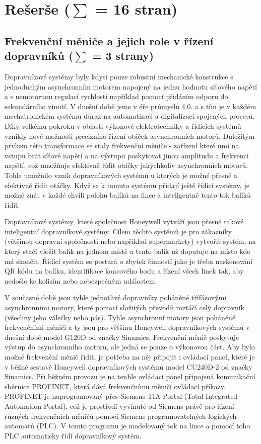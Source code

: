 \chapter{Rešerše ($\sum$ = 16 stran)} \label{chap:Rešerše}
\section{Frekvenční měniče a jejich role v řízení dopravníků ($\sum$ = 3 strany)}\label{sec:FrekvencniMeniceAJejichRole}

Dopravníkové systémy byly kdysi pouze robustní mechanické konstrukce s jednoduchým asynchronním motorem napojený na jednu hodnotu síťového napětí a s nemotornou regulací rychlosti například pomocí přidáním odporu do sekundárního vinutí. V dnešní době jsme v éře průmyslu 4.0. a s tím je v každém mechatronickém systému důraz na automatizaci a digitalizaci spojených procesů. Díky velkému pokroku v oblasti výkonové elektrotechniky a řídících systémů vznikly nové možnosti precizního řízení otáček asynchronních motorů. Důležitým prvkem této transformace se staly frekvenční měniče - zařízení které umí na vstupu brát síťové napětí a na výstupu poskytovat jinou amplitudu a frekvenci napětí, což umožňuje efektivně řídit otáčky jakýchkoliv asynchronních motorů. Tohle umožnilo vznik dopravníkových systémů u kterých je možné přesně a efektivně řídit otáčky. Když se k tomuto systému přidají ještě řídící systémy, je možné znát v každé chvíli polohu balíků na lince a inteligentně tento tok balíků řídit.

Dopravníkové systémy, které společnost Honeywell vytváří jsou přesně takové inteligentní dopravníkové systémy. Cílem těchto systémů je pro zákazníky (většinou dopravní společnosti nebo například supermarkety) vytvořit systém, na který stačí vložit balík na jednom místě a tento balík už doputuje na místo kde má skončit. Řídící systém se postará o zbytek činností jako je třeba naskenování QR kódu na balíku, identifikace koncového bodu a řízení všech linek tak, aby nedošlo ke kolizím nebo nebezpečným událostem.

V současné době jsou tyhle jednotlivé dopravníky poháněné třífázovými asynchronními motory, které pomocí složitých převodů roztáčí celý dopravník (všechny jeho válečky nebo pás). Tyhle asynchronní motory jsou poháněné frekvenčními měniči a ty jsou pro většinu Honeywell dopravníkových systémů v dnešní době model G120D od značky Sinamics. Frekvenční měnič poskytuje výstup do asynchronního motoru, ale jedná se pouze o výkonovou část. Aby bylo možné frekvenční měnič řídit, je potřeba na něj připojit i ovládací panel, které je v běžné sestavě Honeywell dopravníkových systémů model CU240D-2 od značky Sinamics. Při běžném provozu je na tenhle ovládací panel připojená komunikační sběrnice PROFINET, která dává frekvenčnímu měniči ovládací příkazy. PROFINET je naprogramovaný přes Siemens TIA Portal (Total Integrated Automation Portal), což je prostředí vyvinuté od Siemens právě pro řízení různých frekvenčních měničů pomocí Siemens programovatelných logických automatů (PLC). V tomto programu je modelovaný tok na lince a pomocí toho PLC automaticky řídí dopravníkový systém.
\cite{SinamicsG120D}

